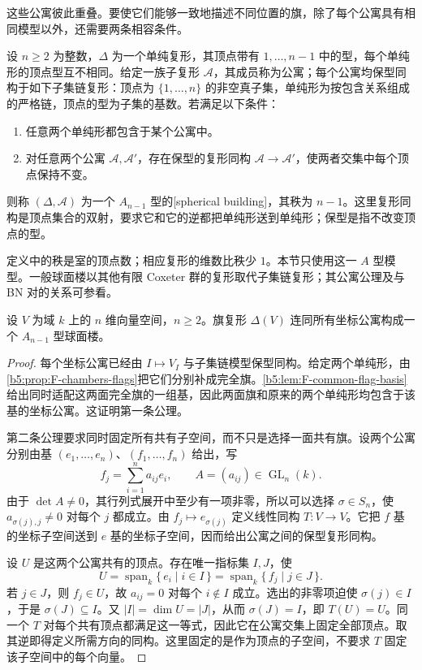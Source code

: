 这些公寓彼此重叠。要使它们能够一致地描述不同位置的旗，除了每个公寓具有相同模型以外，还需要两条相容条件。

\begin{definition}\label{b5:def:F-A-building}
	设 \(n\ge2\) 为整数，\(\Delta\) 为一个单纯复形，其顶点带有 \(1,\ldots,n-1\) 中的型，每个单纯形的顶点型互不相同。给定一族子复形 \(\mathscr A\)，其成员称为公寓；每个公寓均保型同构于如下子集链复形：顶点为 \(\{1,\ldots,n\}\) 的非空真子集，单纯形为按包含关系组成的严格链，顶点的型为子集的基数。若满足以下条件：
	\begin{enumerate}
		\item 任意两个单纯形都包含于某个公寓中。
		\item 对任意两个公寓 \(\mathcal A,\mathcal A'\)，存在保型的复形同构 \(\mathcal A\to\mathcal A'\)，使两者交集中每个顶点保持不变。
	\end{enumerate}
	则称 \((\Delta,\mathscr A)\) 为一个 \(A_{n-1}\) 型的[spherical building]，其秩为 \(n-1\)。这里复形同构是顶点集合的双射，要求它和它的逆都把单纯形送到单纯形；保型是指不改变顶点的型。
\end{definition}

定义中的秩是室的顶点数；相应复形的维数比秩少 \(1\)。本节只使用这一 \(A\) 型模型。一般球面楼以其他有限 Coxeter 群的复形取代子集链复形；其公寓公理及与 BN 对的关系可参看\cite[Chapter 9, pp. 97--100]{Taylor1992ClassicalGroups}。

\begin{theorem}\label{b5:thm:F-vector-building}
	设 \(V\) 为域 \(k\) 上的 \(n\) 维向量空间，\(n\ge2\)。旗复形 \(\Delta(V)\) 连同所有坐标公寓构成一个 \(A_{n-1}\) 型球面楼。
\end{theorem}

\begin{proof}
	每个坐标公寓已经由 \(I\mapsto V_I\) 与子集链模型保型同构。给定两个单纯形，由\cref{b5:prop:F-chambers-flags}把它们分别补成完全旗。\cref{b5:lem:F-common-flag-basis}给出同时适配这两面完全旗的一组基，因此两面旗和原来的两个单纯形均包含于该基的坐标公寓。这证明第一条公理。

	第二条公理要求同时固定所有共有子空间，而不只是选择一面共有旗。设两个公寓分别由基 \((e_1,\ldots,e_n)\)、\((f_1,\ldots,f_n)\) 给出，写
	\[
		f_j=\sum_{i=1}^n a_{ij}e_i,
		\qquad A=(a_{ij})\in\operatorname{GL}_n(k).
	\]
	由于 \(\det A\ne0\)，其行列式展开中至少有一项非零，所以可以选择 \(\sigma\in S_n\)，使 \(a_{\sigma(j),j}\ne0\) 对每个 \(j\) 都成立。由 \(f_j\mapsto e_{\sigma(j)}\) 定义线性同构 \(T:V\to V\)。它把 \(f\) 基的坐标子空间送到 \(e\) 基的坐标子空间，因而给出公寓之间的保型复形同构。

	设 \(U\) 是这两个公寓共有的顶点。存在唯一指标集 \(I,J\)，使
	\[
		U=\operatorname{span}_k\{\,e_i\mid i\in I\,\}
		 =\operatorname{span}_k\{\,f_j\mid j\in J\,\}.
	\]
	若 \(j\in J\)，则 \(f_j\in U\)，故 \(a_{ij}=0\) 对每个 \(i\notin I\) 成立。选出的非零项迫使 \(\sigma(j)\in I\)，于是 \(\sigma(J)\subseteq I\)。又 \(\lvert I\rvert=\dim U=\lvert J\rvert\)，从而 \(\sigma(J)=I\)，即 \(T(U)=U\)。同一个 \(T\) 对每个共有顶点都满足这一等式，因此它在公寓交集上固定全部顶点。取其逆即得定义所需方向的同构。这里固定的是作为顶点的子空间，不要求 \(T\) 固定该子空间中的每个向量。
\end{proof}

